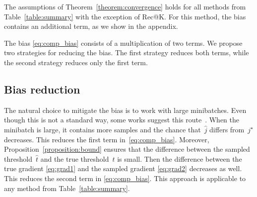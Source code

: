 The assumptions of Theorem~\ref{theorem:convergence} holds for all methods from Table~\ref{table:summary} with the exception of Rec@K. For this method, the bias contains an additional term, as we show in the appendix.

The bias \eqref{eq:comp_bias} consists of a multiplication of two terms. We propose two strategies for reducing the bias. The first strategy reduces both terms, while the second strategy reduces only the first term.

\subsection{Bias reduction}\label{sec:bias2}

The natural choice to mitigate the bias is to work with large minibatches. Even though this is not a standard way, some works suggest this route~\cite{you2019large}. When the minibatch is large, it contains more samples and the chance that~$\hat j$ differs from~$j^{\star}$ decreases. This reduces the first term in~\eqref{eq:comp_bias}. Moreover, Proposition~\ref{proposition:bound} ensures that the difference between the sampled threshold~$\hat{t}$ and the true threshold~$t$ is small. Then the difference between the true gradient \eqref{eq:grad1} and the sampled gradient \eqref{eq:grad2} decreases as well. This reduces the second term in \eqref{eq:comp_bias}. This approach is applicable to any method from Table~\ref{table:summary}.
